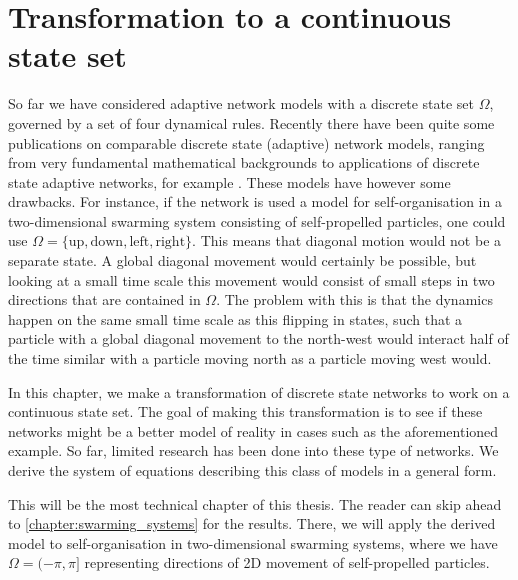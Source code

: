 \chapter{Transformation to a continuous state set}
So far we have considered adaptive network models with a discrete state set $\Omega$, governed by a set of four dynamical rules. Recently there have been quite some publications on comparable discrete state (adaptive) network models, ranging from very fundamental mathematical backgrounds to applications of discrete state adaptive networks, for example \cite{Bauch2002,Chen2016,Demirel2014,Gross2006,Huepe2011,Keeling1999,Kimura2008,Newman2003,Sayama2013,Zschaler2012}. 
These models have however some drawbacks. For instance, if the network is used a model for self-organisation in a two-dimensional swarming system consisting of self-propelled particles, one could use $\Omega=\{\text{up}, \text{down}, \text{left}, \text{right}\}$. This means that diagonal motion would not be a separate state. A global diagonal movement would certainly be possible, but looking at a small time scale this movement would consist of small steps in two directions that are contained in $\Omega$. The problem with this is that the dynamics happen on the same small time scale as this flipping in states, such that a particle with a global diagonal movement to the north-west would interact half of the time similar with a particle moving north as a particle moving west would.

In this chapter, we make a transformation of discrete state networks to work on a continuous state set. The goal of making this transformation is to see if these networks might be a better model of reality in cases such as the aforementioned example. So far, limited research has been done into these type of networks. We derive the system of equations describing this class of models in a general form. 

This will be the most technical chapter of this thesis. The reader can skip ahead to \cref{chapter:swarming_systems} for the results. There, we will apply the derived model to self-organisation in two-dimensional swarming systems, where we have $\Omega = (-\pi,\pi]$ representing directions of 2D movement of self-propelled particles.

 
